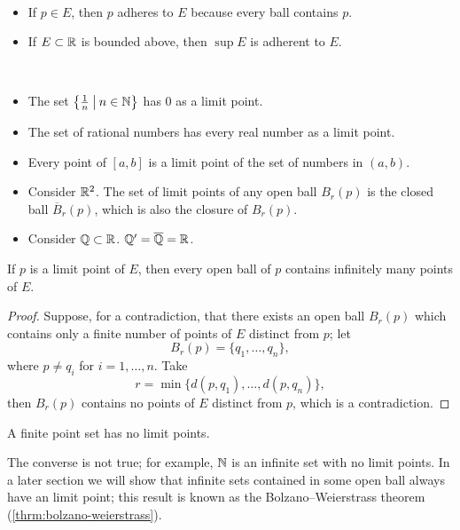 \begin{example} \
\begin{itemize}
\item If $p\in E$, then $p$ adheres to $E$ because every ball contains $p$.
\item If $E\subset\mathbb R$ is bounded above, then $\sup E$ is adherent to $E$.
\end{itemize}
\end{example}

\begin{example} \
\begin{itemize}
\item The set $\left\{\frac{1}{n}\:\big|\:n\in\mathbb N\right\}$ has $0$ as a limit point.
\item The set of rational numbers has every real number as a limit point.
\item Every point of $[a,b]$ is a limit point of the set of numbers in $(a,b)$.
\item Consider $\mathbb R^2$. The set of limit points of any open ball $B_r(p)$ is the closed ball $\overline{B}_r(p)$, which is also the closure of $B_r(p)$.
\item Consider $\mathbb Q\subset\mathbb R$. $\mathbb Q^\prime=\overline{\mathbb Q}=\mathbb R$.
\end{itemize}
\end{example}

\begin{proposition}\label{prop:limit-point-inf-points}
If $p$ is a limit point of $E$, then every open ball of $p$ contains infinitely many points of $E$.
\end{proposition}

\begin{proof}
Suppose, for a contradiction, that there exists an open ball $B_r(p)$ which contains only a finite number of points of $E$ distinct from $p$; let
\[B_r(p)=\{q_1,\dots,q_n\},\]
where $p\neq q_i$ for $i=1,\dots,n$. 
Take
\[r=\min\{d(p,q_1),\dots,d(p,q_n)\},\]
then $B_r(p)$ contains no points of $E$ distinct from $p$, which is a contradiction.
\end{proof}

\begin{corollary}
A finite point set has no limit points.
\end{corollary}

\begin{remark}
The converse is not true; for example, $\mathbb N$ is an infinite set with no limit points. In a later section we will show that infinite sets contained in some open ball always have an limit point; this result is known as the Bolzano--Weierstrass theorem (\ref{thrm:bolzano-weierstrass}).
\end{remark}

